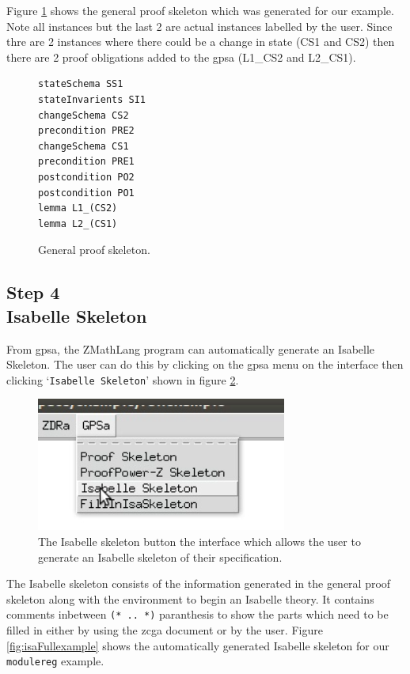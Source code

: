 Figure \ref{fig:gpsaFullexample} shows the general proof skeleton which was generated for our example. Note all instances but the last 2 are actual instances labelled by the user. Since thre are 2 instances where there could be a change in state (CS1 and CS2) then there are 2 proof obligations added to the \gls{gpsa} (L1\_CS2 and L2\_CS1).

\begin{figure}[H]
\centering
\begin{scriptsize}
\begin{BVerbatim}
stateSchema SS1 
stateInvarients SI1 
changeSchema CS2 
precondition PRE2 
changeSchema CS1 
precondition PRE1 
postcondition PO2 
postcondition PO1 
lemma L1_(CS2) 
lemma L2_(CS1) 
\end{BVerbatim}
\end{scriptsize}
\caption{General proof skeleton. \label{fig:gpsaFullexample}}
\end{figure}

\subsection{Step 4\\Isabelle Skeleton}

From \gls{gpsa}, the ZMathLang program can automatically generate an Isabelle Skeleton. The user can do this by clicking on the \gls{gpsa} menu on the interface then clicking `\texttt{Isabelle Skeleton}' shown in figure \ref{fig:isabutton}.

\begin{figure}[H]
\centering
\includegraphics[scale=0.45]{Figures/fullexample/isabelskeleton.png}
\caption{The Isabelle skeleton button the interface which allows the user to generate an Isabelle skeleton of their specification. \label{fig:isabutton}}
\end{figure}

 The Isabelle skeleton consists of the information generated in the general proof skeleton along with the environment to begin an Isabelle theory. It contains comments inbetween \verb|(* .. *)| paranthesis to show the parts which need to be filled in either by using the \gls{zcga} document or by the user. Figure \ref{fig:isaFullexample} shows the automatically generated Isabelle skeleton for our \texttt{modulereg} example.

